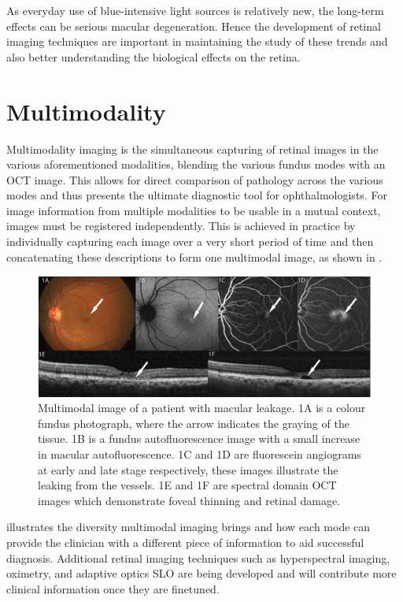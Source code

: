 As everyday use of blue-intensive light sources is relatively new, the long-term effects
can be serious macular degeneration. Hence the development of retinal imaging techniques
are important in maintaining the study of these trends and also better understanding the
biological effects on the retina.

\section{Multimodality}

Multimodality imaging is the simultaneous capturing of retinal images in the various
aforementioned modalities, blending the various fundus modes with an OCT image. This
allows for direct comparison of pathology across the various modes and thus presents
the ultimate diagnostic tool for ophthalmologists. For image information from multiple
modalities to be usable in a mutual context, images must be registered independently.
This is achieved in practice by individually capturing each image over a very short
period of time and then concatenating these descriptions to form one multimodal image,
as shown in . 

\begin{figure}[htbp]
\centering
 \includegraphics{figures/multitwo}
\caption{Multimodal image of a patient with macular leakage. 1A is a colour fundus
photograph, where the arrow indicates the graying of the tissue. 1B is a fundus
autofluorescence image with a small increase in macular autofluorescence. 1C and 1D
are fluorescein angiograms at early and late stage respectively, these images illustrate
the leaking from the vessels. 1E and 1F are spectral domain OCT images which demonstrate
foveal thinning and retinal damage.}
\label{fig:mt}
\end{figure}

 illustrates the diversity multimodal imaging brings and how each mode
can provide the clinician with a different piece of information to aid successful
diagnosis. Additional retinal imaging techniques such as hyperspectral imaging,
oximetry, and adaptive optics SLO are being developed and will contribute more
clinical information once they are finetuned. 

